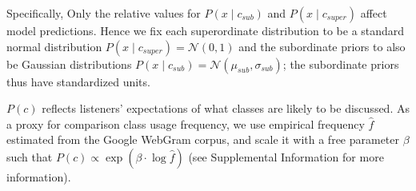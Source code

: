 \documentclass[doc]{apa6}
\begin{document}
Specifically, 
Only the relative values for \(P(x \mid c_{sub})\) and \(P(x \mid c_{super})\) affect model predictions. Hence we fix each superordinate distribution to be a standard normal distribution \(P(x \mid c_{super}) = \mathcal{N}(0, 1)\) and the subordinate priors to also be Gaussian distributions \(P(x \mid c_{sub}) = \mathcal{N}(\mu_{sub}, \sigma_{sub})\); the subordinate priors thus have standardized units.



\(P(c)\) reflects listeners' expectations of what classes are likely to be discussed. As a proxy for comparison class usage frequency, we use empirical frequency \(\hat{f}\) estimated from the Google WebGram corpus, and scale it with a free parameter $\beta$ such that $P(c) \propto \exp{(\beta \cdot \log \hat{f})}$ (see Supplemental Information for more information).
\end{document}
